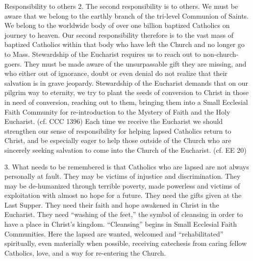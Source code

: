 \documentclass[oneside]{book}
\begin{document}
Responsibility to others
2. The second responsibility is to others. We must be aware that we belong to
the earthly branch of the tri-level Communion of Saints. We belong to the
worldwide body of over one billion baptized Catholics on journey to heaven. Our
second responsibility therefore is to the vast mass of baptized Catholics within
that body who have left the Church and no longer go to Mass. Stewardship of the
Eucharist requires us to reach out to non-church-goers. They must be made aware
of the unsurpassable gift they are missing, and who either out of ignorance,
doubt or even denial do not realize that their salvation is in grave jeopardy.
Stewardship of the Eucharist demands that on our pilgrim way to eternity, we try
to plant the seeds of conversion to Christ in those in need of conversion,
reaching out to them, bringing them into a Small Ecclesial Faith Community for
re-introduction to the Mystery of Faith and the Holy Eucharist. (cf. CCC 1396)
Each time we receive the Eucharist we should strengthen our sense of
responsibility for helping lapsed Catholics return to Christ, and be especially
eager to help those outside of the Church who are sincerely seeking salvation to
come into the Church of the Eucharist. (cf. EE 20)

3. What needs to be remembered is that Catholics who are lapsed are not always
personally at fault. They may be victims of injustice and discrimination. They
may be de-humanized through terrible poverty, made powerless and victims of
exploitation with almost no hope for a future. They need the gifts given at the
Last Supper. They need their faith and hope awakened in Christ in the
Eucharist. They need ``washing of the feet,'' the symbol of cleansing in order
to have a place in Christ's kingdom. ``Cleansing'' begins in Small Ecclesial
Faith Communities. Here the lapsed are wanted, welcomed and ``rehabilitated''
spiritually, even materially when possible, receiving catechesis from caring
fellow Catholics, love, and a way for re-entering the Church.
\end{document}

